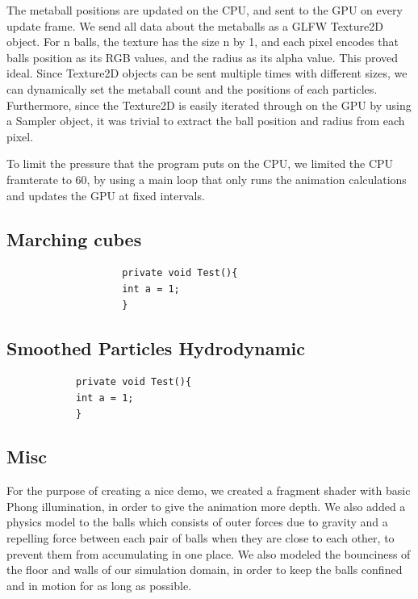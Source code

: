 \documentclass{article}
\begin{document}
\begin{multicols}{2}
        The metaball positions are updated on the CPU, and sent to the GPU on every update frame. We send all data about the metaballs as a GLFW Texture2D object. For n balls, the texture has the size n by 1, and each pixel encodes that balls position as its RGB values, and the radius as its alpha value. This proved ideal. Since Texture2D objects can be sent multiple times with different sizes, we can dynamically set the metaball count and the positions of each particles. Furthermore, since the Texture2D is easily iterated through on the GPU by using a Sampler object, it was trivial to extract the ball position and radius from each pixel.

        To limit the pressure that the program puts on the CPU, we limited the CPU framterate to 60, by using a main loop that only runs the animation calculations and updates the GPU at fixed intervals.

        \subsection{Marching cubes}
        	\begin{minipage}{\linewidth}
			    \begin{lstlisting}
					private void Test(){
					int a = 1;
					}
				\end{lstlisting}
        	\end{minipage}
        
		\subsection{Smoothed Particles Hydrodynamic}
        \begin{minipage}{\linewidth}
        	\begin{lstlisting}
        	private void Test(){
        	int a = 1;
        	}
        	\end{lstlisting}
        \end{minipage}

        \subsection{Misc}
            For the purpose of creating a nice demo, we created a fragment shader with basic Phong illumination, in order to give the animation more depth.
            We also added a physics model to the balls which consists of outer forces due to gravity and a repelling force between each pair of balls when they are close to each other, to prevent them from accumulating in one place.
            We also modeled the bounciness of the floor and walls of our simulation domain, in order to keep the balls confined and in motion for as long as possible.


\end{multicols}
\end{document}
